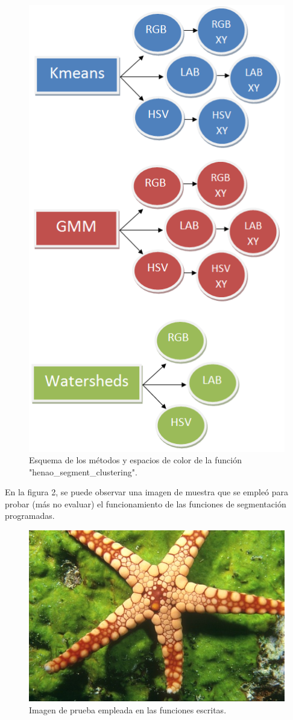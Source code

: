\documentclass[10pt,twocolumn,letterpaper]{article}
\begin{document}
\begin{figure}[t]
\begin{center}
\includegraphics[width=0.6\linewidth]{Esquema_fun.png}
\end{center}
   \caption{Esquema de los métodos y espacios de color de la función "henao\_segment\_clustering".}
\label{fig:seg}
\end{figure}

En la figura 2, se puede observar una imagen de muestra que se empleó para probar (más no evaluar) el funcionamiento de las funciones de segmentación programadas.

\begin{figure}[t]
\begin{center}
\includegraphics[width=0.6\linewidth]{12003.jpg}
\end{center}
   \caption{Imagen de prueba empleada en las funciones escritas.}
\label{fig:seg}
\end{figure}
\end{document}
